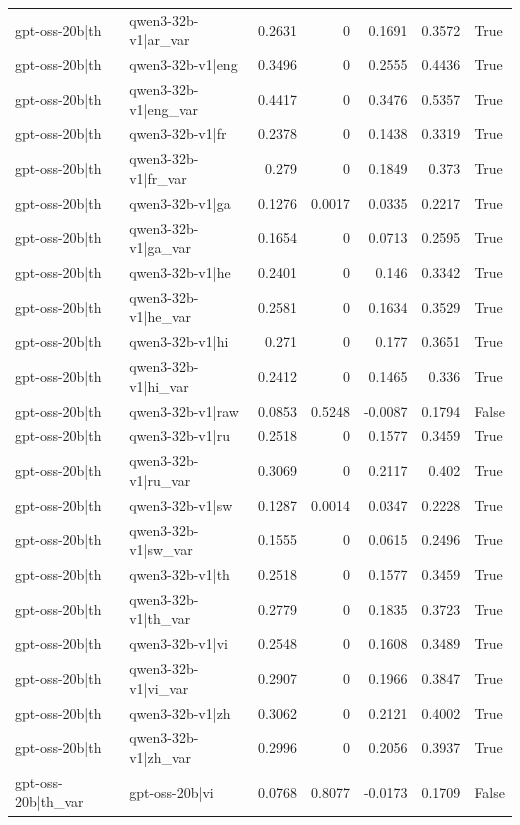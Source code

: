 \begin{table}
\begin{tabular}{l l r r r r l}
gpt-oss-20b|th & qwen3-32b-v1|ar_var & 0.2631 & 0 & 0.1691 & 0.3572 & True \\
gpt-oss-20b|th & qwen3-32b-v1|eng & 0.3496 & 0 & 0.2555 & 0.4436 & True \\
gpt-oss-20b|th & qwen3-32b-v1|eng_var & 0.4417 & 0 & 0.3476 & 0.5357 & True \\
gpt-oss-20b|th & qwen3-32b-v1|fr & 0.2378 & 0 & 0.1438 & 0.3319 & True \\
gpt-oss-20b|th & qwen3-32b-v1|fr_var & 0.279 & 0 & 0.1849 & 0.373 & True \\
gpt-oss-20b|th & qwen3-32b-v1|ga & 0.1276 & 0.0017 & 0.0335 & 0.2217 & True \\
gpt-oss-20b|th & qwen3-32b-v1|ga_var & 0.1654 & 0 & 0.0713 & 0.2595 & True \\
gpt-oss-20b|th & qwen3-32b-v1|he & 0.2401 & 0 & 0.146 & 0.3342 & True \\
gpt-oss-20b|th & qwen3-32b-v1|he_var & 0.2581 & 0 & 0.1634 & 0.3529 & True \\
gpt-oss-20b|th & qwen3-32b-v1|hi & 0.271 & 0 & 0.177 & 0.3651 & True \\
gpt-oss-20b|th & qwen3-32b-v1|hi_var & 0.2412 & 0 & 0.1465 & 0.336 & True \\
gpt-oss-20b|th & qwen3-32b-v1|raw & 0.0853 & 0.5248 & -0.0087 & 0.1794 & False \\
gpt-oss-20b|th & qwen3-32b-v1|ru & 0.2518 & 0 & 0.1577 & 0.3459 & True \\
gpt-oss-20b|th & qwen3-32b-v1|ru_var & 0.3069 & 0 & 0.2117 & 0.402 & True \\
gpt-oss-20b|th & qwen3-32b-v1|sw & 0.1287 & 0.0014 & 0.0347 & 0.2228 & True \\
gpt-oss-20b|th & qwen3-32b-v1|sw_var & 0.1555 & 0 & 0.0615 & 0.2496 & True \\
gpt-oss-20b|th & qwen3-32b-v1|th & 0.2518 & 0 & 0.1577 & 0.3459 & True \\
gpt-oss-20b|th & qwen3-32b-v1|th_var & 0.2779 & 0 & 0.1835 & 0.3723 & True \\
gpt-oss-20b|th & qwen3-32b-v1|vi & 0.2548 & 0 & 0.1608 & 0.3489 & True \\
gpt-oss-20b|th & qwen3-32b-v1|vi_var & 0.2907 & 0 & 0.1966 & 0.3847 & True \\
gpt-oss-20b|th & qwen3-32b-v1|zh & 0.3062 & 0 & 0.2121 & 0.4002 & True \\
gpt-oss-20b|th & qwen3-32b-v1|zh_var & 0.2996 & 0 & 0.2056 & 0.3937 & True \\
gpt-oss-20b|th_var & gpt-oss-20b|vi & 0.0768 & 0.8077 & -0.0173 & 0.1709 & False \\

\end{tabular}
\end{table}
